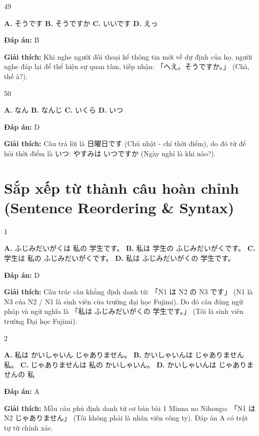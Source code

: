 \documentclass[12pt,a4paper]{report}
\newcommand{\source}[1]{}
\newcommand{\choice}[2]{\textbf{#1.} #2 \quad}
\newcommand{\answer}[1]{\par\textbf{Đáp án:} #1}
\newcommand{\confidence}[1]{}
\newcommand{\explain}[1]{\par\textbf{Giải thích:} #1\vspace{0.5cm}}
\begin{document}
\begin{question}{49}
\source{Q14.webp}
\choice{A}{そうです}
\choice{B}{そうですか}
\choice{C}{いいです}
\choice{D}{えっ}
\answer{B}
\confidence{high}
\explain{Khi nghe người đối thoại kể thông tin mới về dự định của họ, người nghe đáp lại để thể hiện sự quan tâm, tiếp nhận: 「へえ。そうですか。」 (Chà, thế à?).}
\end{question}

\begin{question}{50}
\source{Q19.webp}
\choice{A}{なん}
\choice{B}{なんじ}
\choice{C}{いくら}
\choice{D}{いつ}
\answer{D}
\confidence{high}
\explain{Câu trả lời là 日曜日です (Chủ nhật - chỉ thời điểm), do đó từ để hỏi thời điểm là いつ: やすみは いつですか (Ngày nghỉ là khi nào?).}
\end{question}

\chapter{Sắp xếp từ thành câu hoàn chỉnh (Sentence Reordering \& Syntax)}

\begin{question}{1}
\source{Q5_91_20251121082807.webp}
\choice{A}{ふじみだいがくは 私の 学生です。}
\choice{B}{私は 学生の ふじみだいがくです。}
\choice{C}{学生は 私の ふじみだいがくです。}
\choice{D}{私は ふじみだいがくの 学生です。}
\answer{D}
\confidence{high}
\explain{Cấu trúc câu khẳng định danh từ: 「N1 は N2 の N3 です」 (N1 là N3 của N2 / N1 là sinh viên của trường đại học Fujimi). Do đó câu đúng ngữ pháp và ngữ nghĩa là 「私は ふじみだいがくの 学生です。」 (Tôi là sinh viên trường Đại học Fujimi).}
\end{question}

\begin{question}{2}
\source{Q7_81_20251121082810.webp}
\choice{A}{私は かいしゃいん じゃありません。}
\choice{B}{かいしゃいんは じゃありません 私。}
\choice{C}{じゃありませんは 私の かいしゃいん。}
\choice{D}{かいしゃいんは じゃありませんの 私}
\answer{A}
\confidence{high}
\explain{Mẫu câu phủ định danh từ cơ bản bài 1 Minna no Nihongo: 「N1 は N2 じゃありません」 (Tôi không phải là nhân viên công ty). Đáp án A có trật tự từ chính xác.}
\end{question}
\end{document}
